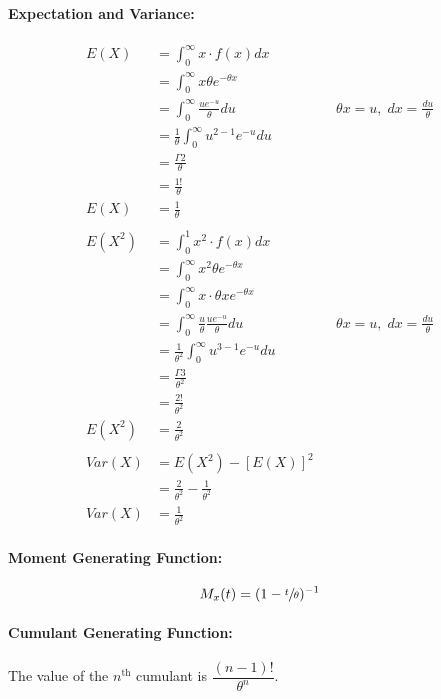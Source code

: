 \documentclass[
10pt, %
a4paper, %
]{report}
\begin{document}
\paragraph{Expectation and Variance:}
\begin{align*}
    E(X) &= \int_0^\infty x \cdot f(x) dx \\
         &= \int_0^\infty x\theta e^{-\theta x} \\
         &= \int_0^\infty \frac{u e^{-u}}{\theta} du && \theta x = u, \; dx = \frac{du}{\theta} \\
         &= \frac{1}{\theta} \int_0^\infty u^{2-1} e^{-u} du \\
         &= \frac{\Gamma 2}{\theta} \\
         &= \frac{1!}{\theta} \\
    E(X) &= \frac{1}{\theta} \\ \\
    E(X^2) &= \int_0^1 x^2 \cdot f(x) dx \\
         &= \int_0^\infty x^2\theta e^{-\theta x} \\
         &= \int_0^\infty x\cdot \theta x e^{-\theta x} \\
         &= \int_0^\infty \frac{u}{\theta} \frac{u e^{-u}}{\theta} du && \theta x = u, \; dx = \frac{du}{\theta} \\
         &= \frac{1}{\theta^2} \int_0^\infty u^{3-1} e^{-u} du \\
         &= \frac{\Gamma 3}{\theta^2} \\
         &= \frac{2!}{\theta^2} \\
    E(X^2) &= \frac{2}{\theta^2}  \\ \\
    Var(X) &= E(X^2) - [E(X)]^2 \\
    &= \frac{2}{\theta^2} - \frac{1}{\theta^2} \\
    Var(X) &= \frac{1}{\theta^2}
\end{align*}

\paragraph{Moment Generating Function:}
\[
M_x(t)=(1-\sfrac{t}{\theta})^{-1}
\]

\paragraph{Cumulant Generating Function:}
The value of the \(n^{\text{th}}\) cumulant is \(\dfrac{(n-1)!}{\theta^n}\).
\end{document}

